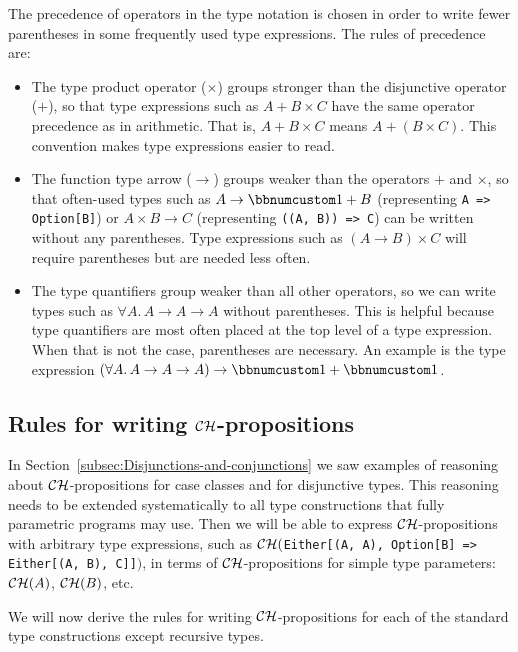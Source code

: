 The precedence of operators
in the type notation is chosen in order to write fewer parentheses
in some frequently used type expressions. The rules of precedence
are:
\begin{itemize}
\item The type product operator ($\times$) groups stronger than the disjunctive
operator ($+$), so that type expressions such as $A+B\times C$ have
the same operator precedence as in arithmetic. That is, $A+B\times C$
means $A+\left(B\times C\right)$. This convention makes type expressions
easier to read.
\item The function type arrow ($\rightarrow$) groups weaker than the operators
$+$ and $\times$, so that often-used types such as $A\rightarrow\bbnum 1+B$
(representing \lstinline!A => Option[B]!) or $A\times B\rightarrow C$
(representing \lstinline!((A, B)) => C!) can be written without any
parentheses. Type expressions such as $\left(A\rightarrow B\right)\times C$
will require parentheses but are needed less often.
\item The type quantifiers group weaker than all other operators, so we
can write types such as $\forall A.\,A\rightarrow A\rightarrow A$
without parentheses. This is helpful because type quantifiers are
most often placed at the top level of a type expression. When that
is not the case, parentheses are necessary. An example is the type
expression $\left(\forall A.\,A\rightarrow A\rightarrow A\right)\rightarrow\bbnum 1+\bbnum 1$.
\end{itemize}

\subsection{Rules for writing ${\cal CH}$-propositions}

In Section~\ref{subsec:Disjunctions-and-conjunctions} we saw examples
of reasoning about ${\cal CH}$-propositions for case classes and
for disjunctive types. This reasoning needs to be extended systematically
to all type constructions that fully parametric programs may use.
Then we will be able to express ${\cal CH}$-propositions with arbitrary
type expressions, such as ${\cal CH}($\lstinline!Either[(A, A), Option[B] => Either[(A, B), C]]!$)$,
in terms of ${\cal CH}$-propositions for simple type parameters:
${\cal CH}(A)$, ${\cal CH}(B)$, etc. 

We will now derive the rules for writing ${\cal CH}$-propositions
for each of the standard type constructions except recursive types.

